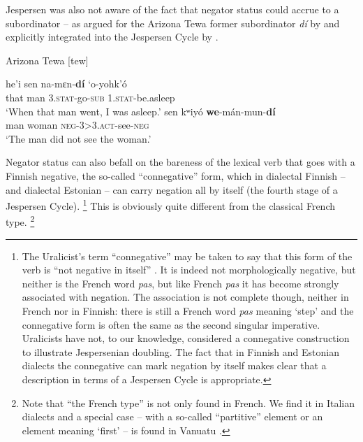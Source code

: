 ﻿\documentclass[output=paper,draft,draftmode,colorlinks,citecolor=brown]{langscibook}
\begin{document}
%
Jespersen was also not aware of the fact that negator status could accrue
to a subordinator -- as argued for the Arizona Tewa former subordinator
\textit{dí} by \textcite{Kroskrity1984} and explicitly integrated into the
Jespersen Cycle by \textcite[83]{Auwera2010}. 
%
\begin{exe}\ex\label{ex:int-tewa-man}
Arizona Tewa [tew] 
\begin{xlist}
\ex \gll he'i  sen  na-mεn-\textbf{dí} `o-yohk'ó \\
    that  man  3.\textsc{stat}-go-\textsc{sub}  1.\textsc{stat}-be.asleep \\
    \glt `When that man went, I was asleep.'
\ex \gll sen  kʷiyó    \textbf{we}-mán-mun-\textbf{dí}\\
man  woman  \textsc{neg-3>3.act}-see-\textsc{neg}\\
\glt `The man did not see the woman.'
\end{xlist}
    \end{exe}
%
Negator status can also befall on the bareness of the lexical verb that
goes with a Finnish negative, the so-called ``connegative'' form, which in
dialectal Finnish \citep[238]{Miestamo2005} -- and dialectal
Estonian
\citep[425--426]{Tamm2015} -- can carry negation all by itself (the fourth
stage of a Jespersen Cycle).%
%
    \footnote{The Uralicist's term ``connegative'' may be taken to say that
    this form of the verb is ``not negative in itself''
    \parencites[82]{Miestamo2005}[56]{WagnerNagy2011}. It is indeed not
    morphologically negative, but neither is the French word \textit{pas},
    but like French \textit{pas} it has become strongly associated with
    negation. The association is not complete though, neither in French nor
    in Finnish: there is still a French word \textit{pas} meaning `step'
    and the connegative form is often the same as the second singular
    imperative.  Uralicists have not, to our knowledge, considered a
    connegative construction to illustrate Jespersenian doubling. The fact
    that in Finnish and Estonian dialects the connegative can mark negation
    by itself makes clear that a description in terms of a Jespersen Cycle
    is appropriate.} %
%
This is obviously quite different from the classical French type.%
%
    \footnote{Note that ``the French type'' is not only found in French.
    We find it in Italian dialects and a special case -- with a so-called
    ``partitive'' element or an element meaning `first' -- is found in
    Vanuatu \parencite[72--74]{VossenAuwera2014}.} %
\end{document}
